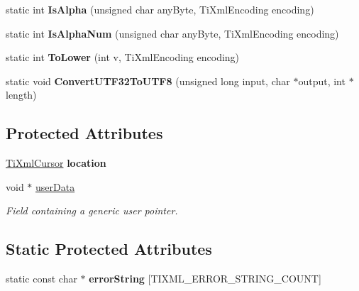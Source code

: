 \begin{DoxyCompactItemize}
\item 
static int {\bfseries Is\+Alpha} (unsigned char any\+Byte, Ti\+Xml\+Encoding encoding)\hypertarget{classTiXmlBase_ae22522b2e8e1ac43102d16394f639fc8}{}\label{classTiXmlBase_ae22522b2e8e1ac43102d16394f639fc8}

\item 
static int {\bfseries Is\+Alpha\+Num} (unsigned char any\+Byte, Ti\+Xml\+Encoding encoding)\hypertarget{classTiXmlBase_a321919055c115c78ded17f85a793f368}{}\label{classTiXmlBase_a321919055c115c78ded17f85a793f368}

\item 
static int {\bfseries To\+Lower} (int v, Ti\+Xml\+Encoding encoding)\hypertarget{classTiXmlBase_a799f17405a86a5c2029618e85f11a097}{}\label{classTiXmlBase_a799f17405a86a5c2029618e85f11a097}

\item 
static void {\bfseries Convert\+U\+T\+F32\+To\+U\+T\+F8} (unsigned long input, char $\ast$output, int $\ast$length)\hypertarget{classTiXmlBase_a07c765e3a7f979d343e646ea797b180b}{}\label{classTiXmlBase_a07c765e3a7f979d343e646ea797b180b}

\end{DoxyCompactItemize}
\subsection*{Protected Attributes}
\begin{DoxyCompactItemize}
\item 
\hyperlink{structTiXmlCursor}{Ti\+Xml\+Cursor} {\bfseries location}\hypertarget{classTiXmlBase_a0d992580f3bc264909f898e942677a3c}{}\label{classTiXmlBase_a0d992580f3bc264909f898e942677a3c}

\item 
void $\ast$ \hyperlink{classTiXmlBase_ab242c01590191f644569fa89a080d97c}{user\+Data}\hypertarget{classTiXmlBase_ab242c01590191f644569fa89a080d97c}{}\label{classTiXmlBase_ab242c01590191f644569fa89a080d97c}

\begin{DoxyCompactList}\small\item\em Field containing a generic user pointer. \end{DoxyCompactList}\end{DoxyCompactItemize}
\subsection*{Static Protected Attributes}
\begin{DoxyCompactItemize}
\item 
static const char $\ast$ {\bfseries error\+String} \mbox{[}T\+I\+X\+M\+L\+\_\+\+E\+R\+R\+O\+R\+\_\+\+S\+T\+R\+I\+N\+G\+\_\+\+C\+O\+U\+NT\mbox{]}
\end{DoxyCompactItemize}
